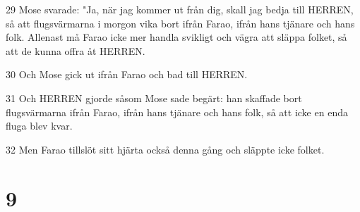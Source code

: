 \par 29 Mose svarade: "Ja, när jag kommer ut från dig, skall jag bedja till HERREN, så att flugsvärmarna i morgon vika bort ifrån Farao, ifrån hans tjänare och hans folk. Allenast må Farao icke mer handla svikligt och vägra att släppa folket, så att de kunna offra åt HERREN.
\par 30 Och Mose gick ut ifrån Farao och bad till HERREN.
\par 31 Och HERREN gjorde såsom Mose sade begärt: han skaffade bort flugsvärmarna ifrån Farao, ifrån hans tjänare och hans folk, så att icke en enda fluga blev kvar.
\par 32 Men Farao tillslöt sitt hjärta också denna gång och släppte icke folket.

\chapter{9}

